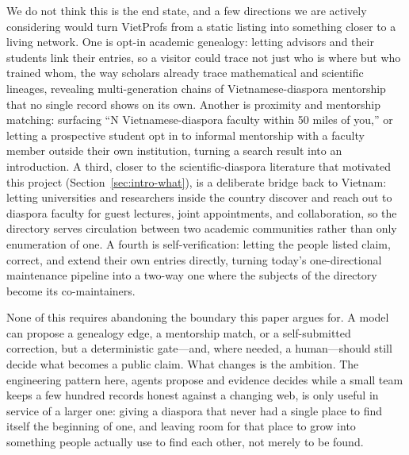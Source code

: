 \documentclass[11pt]{article}
\begin{document}
We do not think this is the end state, and a few directions we are actively considering would turn VietProfs from a static listing into something closer to a living network.
One is opt-in academic genealogy: letting advisors and their students link their entries, so a visitor could trace not just who is where but who trained whom, the way scholars already trace mathematical and scientific lineages, revealing multi-generation chains of Vietnamese-diaspora mentorship that no single record shows on its own.
Another is proximity and mentorship matching: surfacing ``N Vietnamese-diaspora faculty within 50 miles of you,'' or letting a prospective student opt in to informal mentorship with a faculty member outside their own institution, turning a search result into an introduction.
A third, closer to the scientific-diaspora literature that motivated this project (Section~\ref{sec:intro-what}), is a deliberate bridge back to Vietnam: letting universities and researchers inside the country discover and reach out to diaspora faculty for guest lectures, joint appointments, and collaboration, so the directory serves circulation between two academic communities rather than only enumeration of one.
A fourth is self-verification: letting the people listed claim, correct, and extend their own entries directly, turning today's one-directional maintenance pipeline into a two-way one where the subjects of the directory become its co-maintainers.

None of this requires abandoning the boundary this paper argues for.
A model can propose a genealogy edge, a mentorship match, or a self-submitted correction, but a deterministic gate---and, where needed, a human---should still decide what becomes a public claim.
What changes is the ambition.
The engineering pattern here, agents propose and evidence decides while a small team keeps a few hundred records honest against a changing web, is only useful in service of a larger one: giving a diaspora that never had a single place to find itself the beginning of one, and leaving room for that place to grow into something people actually use to find each other, not merely to be found.



\end{document}
